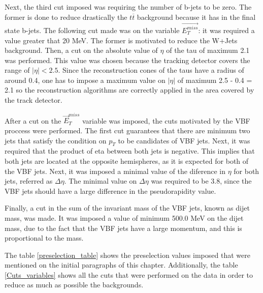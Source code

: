 Next, the third cut imposed was requiring the number of b-jets to be zero. The former is done to reduce drastically the $t\overline{t}$ background because it has in the final state b-jets. The 
following cut made was on the variable $\vec{E_T^{miss}}$: it was required a value greater that 20 MeV. The former is motivated to reduce the W+Jets background. Then, a cut on the absolute value of $\eta$ of the tau of maximum 2.1 was performed. This value was 
chosen because the tracking detector covers the range of $|\eta|<2.5$. Since the reconstruction cones of the taus have a radius of around 0.4, one has to impose a maximum value on $|\eta|$ of 
maximum 2.5 - 0.4 = 2.1 so the reconstruction algorithms are correctly applied in the area covered by the track detector.
  
After a cut on the $\vec{E}_T^{miss}$ variable was imposed, the cuts motivated by the VBF proccess were performed. The first cut guarantees that there are minimum two jets that satisfy the 
condition on $p_T$ to be candidates of VBF jets. Next, it was required that the product of eta between both jets is negative. This implies that both jets are located at the opposite hemispheres,
as it is expected for both of the VBF jets. Next, it was imposed a minimal value of the diference in $\eta$ for both jets, referred as $\Delta \eta$. The minimal value on $\Delta \eta$ was required 
to be 3.8, since the VBF jets should have a large difference in the pseudorapidity value. 


Finally, a cut in the sum of the invariant mass of the VBF jets, known as dijet mass, was made. It was imposed a 
value of minimum 500.0 MeV on the dijet mass, due to the fact that the VBF jets have a large momentum, and this is proportional to the mass.  

The table \ref{preselection_table} shows the preselection values imposed that were mentioned on the initial paragraphs of this chapter. Additionally, the table \ref{Cuts_variables} shows all 
the cuts that were performed on the data in order to reduce as much as possible the backgrounds. 

